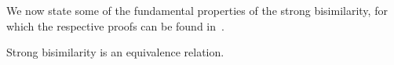 We now state some of the fundamental properties of the strong bisimilarity, for which the respective proofs can be found in~\cite{pi_calculus}.

\begin{proposition}[Equivalence]\label{prop:bisimilarity_is_equivalence}
Strong bisimilarity is an equivalence relation.
\end{proposition}







